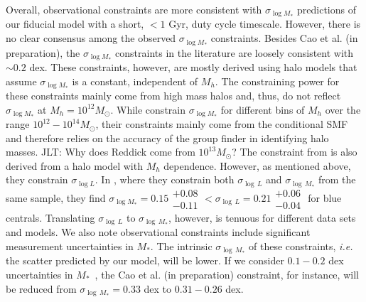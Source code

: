 \documentclass[12pt, letterpaper, preprint, tighten]{aastex62}
\newcommand{\ch}[1]{{\color{orange}{\bf CH:} #1}}
\newcommand{\edt}[1]{{\color{dred}{\bf} #1}}
\newcommand{\cao}{Cao et al. (in preparation)}
\newcommand{\siglogm}{\sigma_{\log M_*}}
\begin{document}
\edt{Overall, observational constraints are more consistent with $\siglogm$ 
predictions of our fiducial model with a short, $< 1$ Gyr, duty cycle timescale. 
However, there is no clear consensus among the observed $\siglogm$ constraints. 
Besides \cao, the $\siglogm$ constraints in the literature are loosely 
consistent with $\sim 0.2$ dex. These constraints, however, are mostly derived 
using halo models that assume $\siglogm$ is a constant, independent of $M_h$. 
The constraining power for these constraints mainly come from high mass halos 
and, thus, do not reflect $\siglogm$ at $M_h=10^{12}M_\odot$}.
While \cite{reddick2013} constrain $\siglogm$ for different bins of
$M_h$ over the range $10^{12} - 10^{14} M_\odot$, %
their constraints mainly come from the conditional SMF and therefore relies on
the accuracy of the \cite{tinker2011} group finder in identifying halo masses.
\ch{JLT: Why does Reddick come from $10^{13} M_\odot$?} %
The constraint from \cite{lange2018a} is also derived from a halo model
with $M_h$ dependence. However, as mentioned above, they constrain $\sigma_{\log L}$.
In \cite{more2011}, where they constrain both $\sigma_{\log\,L}$ and $\sigma_{\log\,M_*}$
from the same sample, they find
$\siglogm = 0.15\substack{+0.08\\ -0.11} < \sigma_{\log\,L} = 0.21\substack{+0.06\\ -0.04}$
for blue centrals. Translating $\sigma_{\log\,L}$ to $\sigma_{\log\,M_*}$, however, 
is tenuous for different data sets and models. %
\edt{We also note observational constraints include significant measurement
uncertainties in $M_*$. The intrinsic $\sigma_{\log\,M_*}$ of these constraints,
\emph{i.e.} the scatter predicted by our model, will be lower. If we consider
$0.1 - 0.2$ dex uncertainties in $M_*$~\citep{roediger2015}, the
Cao et al. (in preparation) constraint, for instance, will be reduced from
$\sigma_{\log\,M_*} = 0.33$ dex to $0.31 - 0.26$ dex. }
\end{document}
